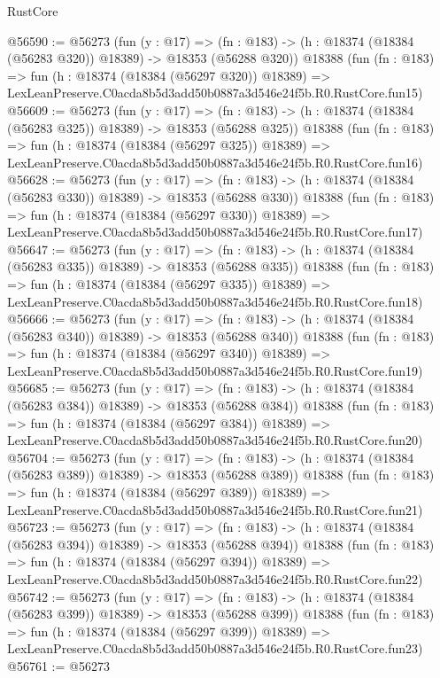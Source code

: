 \begin{lexlean}{RustCore}
\begin{coremodule}
@56590 := @56273
    (fun (y : @17) =>
    (fn : @183) -> (h : @18374 (@18384 (@56283 @320)) @18389) -> @18353 (@56288 @320))
    @18388
    (fun (fn : @183) =>
    fun (h : @18374 (@18384 (@56297 @320)) @18389) =>
    LexLeanPreserve.C0acda8b5d3add50b0887a3d546e24f5b.R0.RustCore.fun15)
@56609 := @56273
    (fun (y : @17) =>
    (fn : @183) -> (h : @18374 (@18384 (@56283 @325)) @18389) -> @18353 (@56288 @325))
    @18388
    (fun (fn : @183) =>
    fun (h : @18374 (@18384 (@56297 @325)) @18389) =>
    LexLeanPreserve.C0acda8b5d3add50b0887a3d546e24f5b.R0.RustCore.fun16)
@56628 := @56273
    (fun (y : @17) =>
    (fn : @183) -> (h : @18374 (@18384 (@56283 @330)) @18389) -> @18353 (@56288 @330))
    @18388
    (fun (fn : @183) =>
    fun (h : @18374 (@18384 (@56297 @330)) @18389) =>
    LexLeanPreserve.C0acda8b5d3add50b0887a3d546e24f5b.R0.RustCore.fun17)
@56647 := @56273
    (fun (y : @17) =>
    (fn : @183) -> (h : @18374 (@18384 (@56283 @335)) @18389) -> @18353 (@56288 @335))
    @18388
    (fun (fn : @183) =>
    fun (h : @18374 (@18384 (@56297 @335)) @18389) =>
    LexLeanPreserve.C0acda8b5d3add50b0887a3d546e24f5b.R0.RustCore.fun18)
@56666 := @56273
    (fun (y : @17) =>
    (fn : @183) -> (h : @18374 (@18384 (@56283 @340)) @18389) -> @18353 (@56288 @340))
    @18388
    (fun (fn : @183) =>
    fun (h : @18374 (@18384 (@56297 @340)) @18389) =>
    LexLeanPreserve.C0acda8b5d3add50b0887a3d546e24f5b.R0.RustCore.fun19)
@56685 := @56273
    (fun (y : @17) =>
    (fn : @183) -> (h : @18374 (@18384 (@56283 @384)) @18389) -> @18353 (@56288 @384))
    @18388
    (fun (fn : @183) =>
    fun (h : @18374 (@18384 (@56297 @384)) @18389) =>
    LexLeanPreserve.C0acda8b5d3add50b0887a3d546e24f5b.R0.RustCore.fun20)
@56704 := @56273
    (fun (y : @17) =>
    (fn : @183) -> (h : @18374 (@18384 (@56283 @389)) @18389) -> @18353 (@56288 @389))
    @18388
    (fun (fn : @183) =>
    fun (h : @18374 (@18384 (@56297 @389)) @18389) =>
    LexLeanPreserve.C0acda8b5d3add50b0887a3d546e24f5b.R0.RustCore.fun21)
@56723 := @56273
    (fun (y : @17) =>
    (fn : @183) -> (h : @18374 (@18384 (@56283 @394)) @18389) -> @18353 (@56288 @394))
    @18388
    (fun (fn : @183) =>
    fun (h : @18374 (@18384 (@56297 @394)) @18389) =>
    LexLeanPreserve.C0acda8b5d3add50b0887a3d546e24f5b.R0.RustCore.fun22)
@56742 := @56273
    (fun (y : @17) =>
    (fn : @183) -> (h : @18374 (@18384 (@56283 @399)) @18389) -> @18353 (@56288 @399))
    @18388
    (fun (fn : @183) =>
    fun (h : @18374 (@18384 (@56297 @399)) @18389) =>
    LexLeanPreserve.C0acda8b5d3add50b0887a3d546e24f5b.R0.RustCore.fun23)
@56761 := @56273

\end{coremodule}
\end{lexlean}
